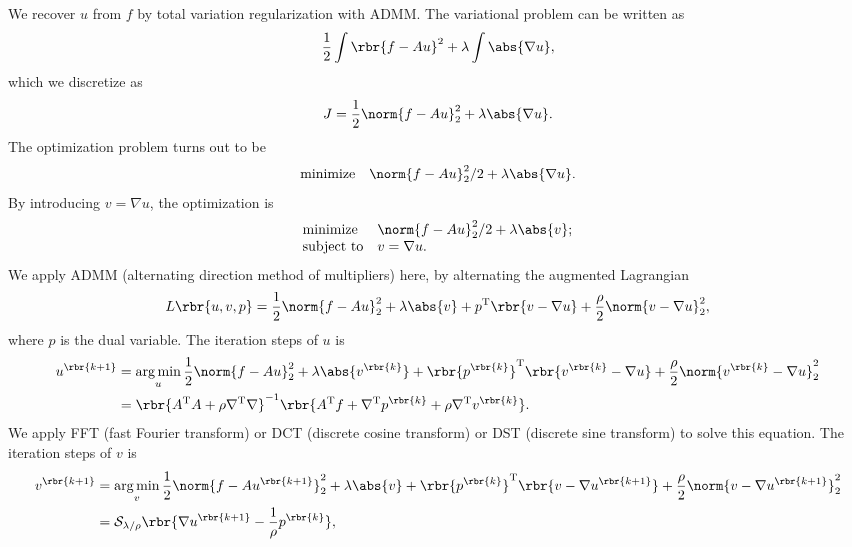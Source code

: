 \documentclass[english, nochinese]{pnote}
\begin{document}
We recover $u$ from $f$ by total variation regularization with ADMM. The variational problem can be written as
\begin{equation}
\frac{1}{2} \int \rbr{ f - A u }^2 + \lambda \int \abs{ \nabla u },
\end{equation}
which we discretize as
\begin{equation}
J = \frac{1}{2} \norm{ f - A u }_2^2 + \lambda \abs{ \nabla u }.
\end{equation}
The optimization problem turns out to be
\begin{equation}
\begin{array}{ll}
\text{minimize} & \norm{ f - A u }_2^2 / 2 + \lambda \abs{ \nabla u }.
\end{array}
\end{equation}
By introducing $ v = \nabla u $, the optimization is
\begin{equation}
\begin{array}{ll}
\text{minimize} & \norm{ f - A u }_2^2 / 2 + \lambda \abs{v}; \\
\text{subject to} & v = \nabla u.
\end{array}
\end{equation}
We apply ADMM (alternating direction method of multipliers) here, by alternating the augmented Lagrangian
\begin{equation}
L \rbr{ u, v, p } = \frac{1}{2} \norm{ f - A u }_2^2 + \lambda \abs{v} + p^{\text{T}} \rbr{ v - \nabla u } + \frac{\rho}{2} \norm{ v - \nabla u }_2^2,
\end{equation}
where $p$ is the dual variable. The iteration steps of $u$ is
\begin{equation} \label{Eq:ItU}
\begin{split}
u^{\rbr{ k + 1 }} &= \mathop{\arg\min}_u \frac{1}{2} \norm{ f - A u }_2^2 + \lambda \abs{v^{\rbr{k}}} + \rbr{p^{\rbr{k}}}^{\text{T}} \rbr{ v^{\rbr{k}} - \nabla u } + \frac{\rho}{2} \norm{ v^{\rbr{k}} - \nabla u }_2^2 \\
&= \rbr{ A^{\text{T}} A + \rho \nabla^{\text{T}} \nabla }^{-1} \rbr{ A^{\text{T}} f + \nabla^{\text{T}} p^{\rbr{k}} + \rho \nabla^{\text{T}} v^{\rbr{k}} }.
\end{split}
\end{equation}
We apply FFT (fast Fourier transform) or DCT (discrete cosine transform) or DST (discrete sine transform) to solve this equation. The iteration steps of $v$ is
\begin{equation}
\begin{split} \label{Eq:ItV}
v^{\rbr{ k + 1 }} &= \mathop{\arg\min}_v \frac{1}{2} \norm{ f - A u^{\rbr{ k + 1 }} }_2^2 + \lambda \abs{v} + \rbr{p^{\rbr{k}}}^{\text{T}} \rbr{ v - \nabla u^{\rbr{ k + 1 }} } + \frac{\rho}{2} \norm{ v - \nabla u^{\rbr{ k + 1 }} }_2^2 \\
&= \mathcal{S}_{ \lambda / \rho } \rbr{ \nabla u^{\rbr{ k + 1 }} - \frac{1}{\rho} p^{\rbr{k}} },
\end{split}
\end{equation}
\end{document}
